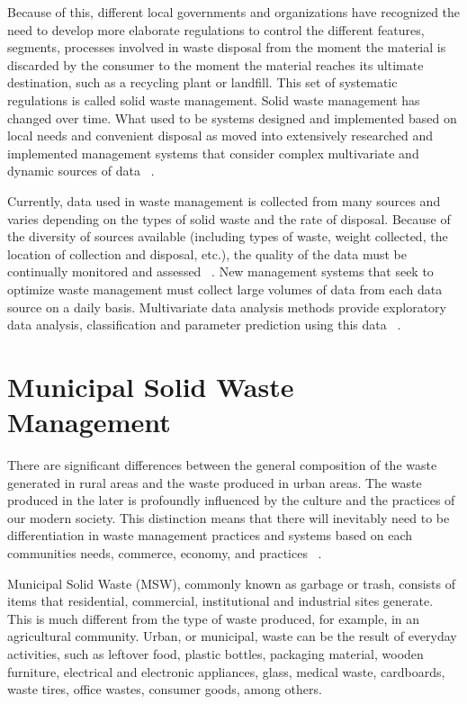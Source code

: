 \documentclass[sigconf]{acmart}
\begin{document}
Because of this, different local governments and organizations have recognized the need to develop more elaborate regulations to control the different features, segments, processes involved in waste disposal from the moment the material is discarded by the consumer to the moment the material reaches its ultimate destination, such as a recycling plant or landfill. This set of systematic regulations is called solid waste management. Solid waste management has changed over time.  What used to be systems designed and implemented based on local needs and convenient disposal as moved into extensively researched and implemented management systems that consider complex multivariate and dynamic sources of data ~\cite{akbarpour2016}.

Currently, data used in waste management is collected from many sources and varies depending on the types of solid waste and the rate of disposal. Because of the diversity of sources available (including types of waste, weight collected, the location of collection and disposal, etc.), the quality of the data must be continually monitored and assessed ~\cite{chandrappa2012}. New management systems that seek to optimize waste management must collect large volumes of data from each data source on a daily basis. Multivariate data analysis methods provide exploratory data analysis, classification and parameter prediction using this data ~\cite{bohm2013}.

\section{ Municipal Solid Waste Management}

There are significant differences between the general composition of the waste generated in rural areas and the waste produced in urban areas. The waste produced in the later is profoundly influenced by the culture and the practices of our modern society.  This distinction means that there will inevitably need to be differentiation in waste management practices and systems based on each communities needs, commerce, economy, and practices ~\cite{chandrappa2012}.

Municipal Solid Waste (MSW), commonly known as garbage or trash, consists of items that residential, commercial, institutional and industrial sites generate. This is much different from the type of waste produced, for example, in an agricultural community.  Urban, or municipal, waste can be the result of everyday activities, such as leftover food, plastic bottles, packaging material, wooden furniture, electrical and electronic appliances, glass, medical waste, cardboards, waste tires, office wastes, consumer goods, among others. 
\end{document}
